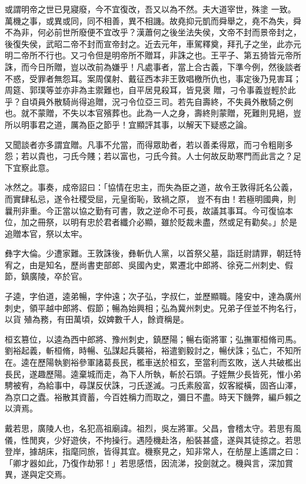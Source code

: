 \begin{pinyinscope}
 或謂明帝之世已見寢廢，今不宜復改，吾又以為不然。夫大道宰世，殊塗
 一致。萬機之事，或異或同，同不相善，異不相譏。故堯抑元凱而舜舉之，堯不為失，舜不為非，何必前世所廢便不宜改乎？漢蕭何之後坐法失侯，文帝不封而景帝封之，後復失侯，武昭二帝不封而宣帝封之。近去元年，車駕釋奠，拜孔子之坐，此亦元明二帝所不行也。又刁令但是明帝所不贈耳，非誅之也。王平子、第五猗皆元帝所誅，而今日所贈，豈以改前為嫌乎！凡處事者，當上合古義，下準今例，然後談者不惑，受罪者無怨耳。案周僕射、戴征西本非王敦唱檄所仇也，事定後乃見害耳；周筵、郭璞等並亦非為主禦難也，自平居見殺耳，皆見褒
 贈，刁令事義豈輕於此乎？自頃員外散騎尚得追贈，況刁令位亞三司。若先自壽終，不失員外散騎之例也。就不蒙贈，不失以本官殯葬也。此為一人之身，壽終則蒙贈，死難則見絕，豈所以明事君之道，厲為臣之節乎！宜顯評其事，以解天下疑惑之論。



 又聞談者亦多謂宜贈。凡事不允當，而得眾助者，若以善柔得眾，而刁令粗剛多怨；若以貴也，刁氏今賤；若以富也，刁氏今貧。人士何故反助寒門而此言之？足下宜察此意。



 冰然之。事奏，成帝詔曰：「協情在忠主，而失為臣之道，故令王敦得託名公義，而實肆私忌，遂令社稷受屈，元皇銜恥，致禍之原，
 豈不有由！若極明國典，則曩刑非重。今正當以協之勤有可書，敦之逆命不可長，故議其事耳。今可復協本位，加之冊祭，以明有忠於君者纖介必顯，雖於貶裁未盡，然或足有勸矣。」於是追贈本官，祭以太牢。



 彝字大倫。少遭家難。王敦誅後，彝斬仇人黨，以首祭父墓，詣廷尉請罪，朝廷特宥之，由是知名，歷尚書吏部郎、吳國內史，累遷北中郎將、徐兗二州刺史、假節，鎮廣陵，卒於官。



 子逵，字伯道，逵弟暢，字仲遠；次子弘，字叔仁，並歷顯職。隆安中，達為廣州刺史，領平越中郎將、假節；暢為始興相；弘為冀州刺史。兄弟子侄並不拘名行，以貨
 殖為務，有田萬頃，奴婢數千人，餘資稱是。



 桓玄篡位，以逵為西中郎將、豫州刺史，鎮歷陽；暢右衛將軍；弘撫軍桓脩司馬。劉裕起義，斬桓脩，時暢、弘謀起兵襲裕，裕遣劉毅討之，暢伏誅；弘亡，不知所在。逵在歷陽執劉裕參軍諸葛長民，檻車送於桓玄，至當利而玄敗，送人共破檻出長民，遂趣歷陽。逵棄城而走，為下人所執，斬於石頭。子姪無少長皆死，惟小弟騁被宥，為給事中，尋謀反伏誅，刁氏遂滅。刁氏素殷富，奴客縱橫，固吝山澤，為京口之蠹。裕散其資蓄，今百姓稱力而取之，彌日不盡。時天下饑弊，編戶賴之以濟焉。



 戴若思，廣陵人也，名犯高祖廟諱。祖烈，吳左將軍。父昌，會稽太守。若思有風儀，性閒爽，少好遊俠，不拘操行。遇陸機赴洛，船裝甚盛，遂與其徒掠之。若思登岸，據胡床，指麾同旅，皆得其宜。機察見之，知非常人，在舫屋上遙謂之曰：「卿才器如此，乃復作劫邪！」若思感悟，因流涕，投劍就之。機與言，深加賞異，遂與定交焉。




\end{pinyinscope}

